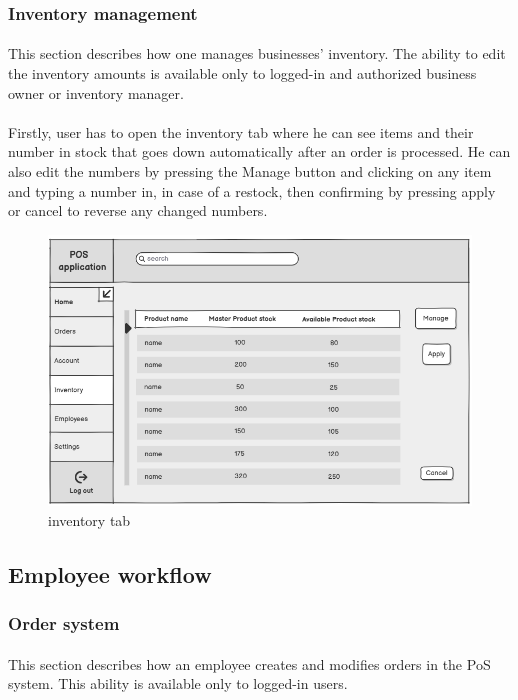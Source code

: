 \documentclass{article}
\begin{document}
    \subsubsection{Inventory management}
    \paragraph{}This section describes how one manages businesses' inventory. The ability to edit the inventory amounts is available only to logged-in and authorized business owner or inventory manager.
    \paragraph{}Firstly, user has to open the inventory tab where he can see items and their number in stock that goes down automatically after an order is processed. He can also edit the numbers by pressing the Manage button and clicking on any item and typing a number in, in case of a restock, then confirming by pressing apply or cancel to reverse any changed numbers.
    \begin{figure}[H]
        \centering
        \includegraphics[width=0.9\linewidth]{PSP/lab-1/mockups/inventory.png}
        \caption{inventory tab}
        \label{}
    \end{figure}

    \subsection{Employee workflow}
    \subsubsection{Order system}
    \paragraph{}This section describes how an employee creates and modifies orders in the PoS system. This ability is available only to logged-in users.
\end{document}
